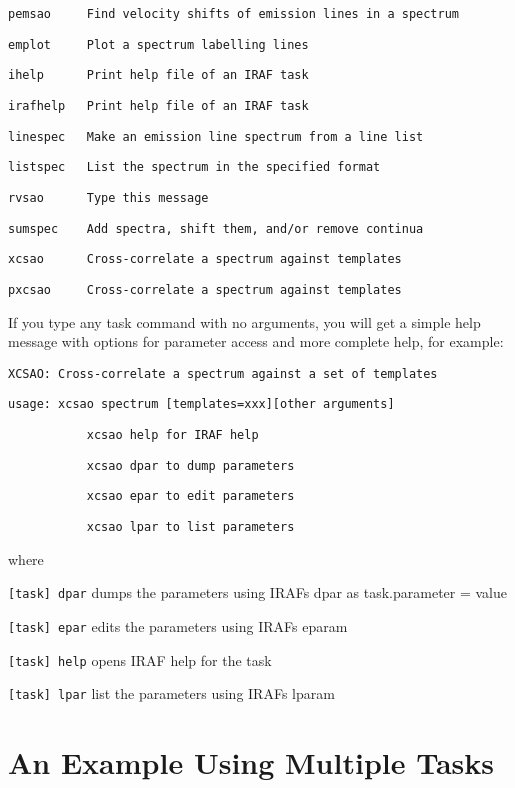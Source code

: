 \texttt{pemsao~~~~~Find velocity shifts of emission lines in a spectrum}

\texttt{emplot~~~~~Plot a spectrum labelling lines}

\texttt{ihelp~~~~~~Print help file of an IRAF task}

\texttt{irafhelp~~~Print help file of an IRAF task}

\texttt{linespec~~~Make an emission line spectrum from a line list}

\texttt{listspec~~~List the spectrum in the specified format}

\texttt{rvsao~~~~~~Type this message}

\texttt{sumspec~~~~Add spectra, shift them, and/or remove continua}

\texttt{xcsao~~~~~~Cross-correlate a spectrum against templates}

\texttt{pxcsao~~~~~Cross-correlate a spectrum against templates}

If you type any task command with no arguments, you will get a simple help message with options for parameter access and more complete help, for example:

\texttt{XCSAO: Cross-correlate a spectrum against a set of templates}

\texttt{usage: xcsao spectrum [templates=xxx][other arguments]}

\texttt{~~~~~~~~~~~xcsao help for IRAF help}

\texttt{~~~~~~~~~~~xcsao dpar to dump parameters}

\texttt{~~~~~~~~~~~xcsao epar to edit parameters}

\texttt{~~~~~~~~~~~xcsao lpar to list parameters}

where

\texttt{[task] dpar} dumps the parameters using IRAFs dpar as task.parameter = value

\texttt{[task] epar} edits the parameters using IRAFs eparam

\texttt{[task] help} opens IRAF help for the task

\texttt{[task] lpar} list the parameters using IRAFs lparam

\section{An Example Using Multiple Tasks}

